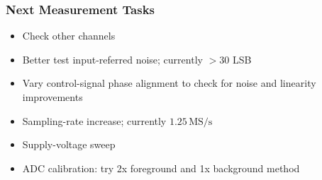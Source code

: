 \documentclass[aspectratio=169]{beamer}
\begin{document}
\begin{frame}
  \frametitle{Next Measurement Tasks}
  \begin{itemize}
    \item Check other channels
    \item Better test input-referred noise; currently $>30$ LSB
    \item Vary control-signal phase alignment to check for noise and linearity improvements
    \item Sampling-rate increase; currently $1.25\,\mathrm{MS/s}$
    \item Supply-voltage sweep
    \item ADC calibration: try 2x foreground and 1x background method
  \end{itemize}
\end{frame}
\end{document}
